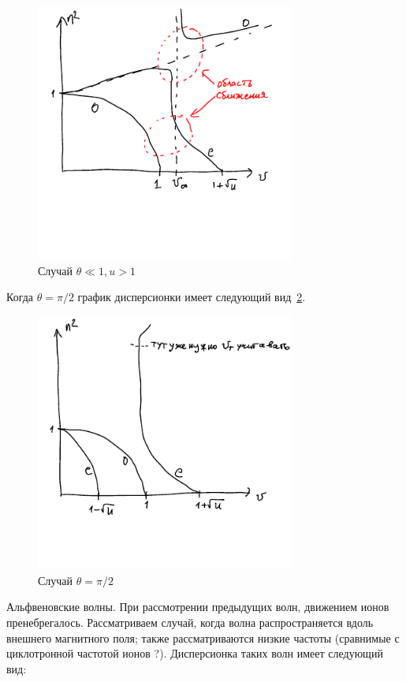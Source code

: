 \documentclass[10pt, a4paper]{article}
\begin{document}
\begin{figure}[h!]
	\begin{center}
		\includegraphics[width=85mm]{theta-small-u-more-1.pdf}
	\end{center}
	\caption{Случай $\theta\ll1, u > 1$}	
	\label{fig:disp_eq_th_small_u_more_1}
\end{figure}

Когда $\theta=\pi/2$ график дисперсионки имеет следующий вид~\ref{fig:disp_eq_pi_2}.

\begin{figure}[h!]
	\begin{center}
		\includegraphics[width=85mm]{theta-90.pdf}
	\end{center}
	\caption{Случай $\theta=\pi/2$}		
	\label{fig:disp_eq_pi_2}
\end{figure}

Альфвеновские волны. При рассмотрении предыдущих волн, движением ионов пренебрегалось. Рассматриваем случай, когда волна распространяется вдоль внешнего магнитного поля; также рассматриваются низкие частоты (сравнимые с циклотронной частотой ионов ?). Дисперсионка таких волн имеет следующий вид:
\end{document}
